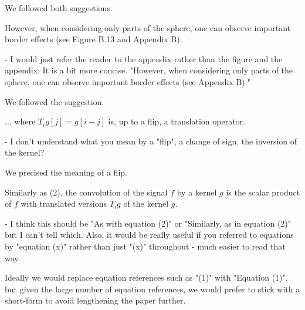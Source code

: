 \documentclass[12pt,a4paper]{article}
\newcommand{\nati}[1]{{\color[rgb]{.1,.6,.1}{NP: #1}}}
\newcommand{\mdeff}[1]{{\color[rgb]{.1,.6,.1}{MD: #1}}}
\newcommand{\1}{\b{1}}              %
\newcommand{\0}{\b{0}}              %
\begin{document}
We followed both suggestions.

\begin{mdframed}[style=comment]
However, when considering only parts of the sphere, one can observe important border effects (see Figure B.13 and Appendix B).

- I would just refer the reader to the appendix rather than the figure and the appendix. It is a bit more concise. "However, when considering only parts of the sphere, one can observe important border effects (see Appendix B)."
\end{mdframed}

We followed the suggestion.

\begin{mdframed}[style=comment]
... where $T_ig[j]=g[i-j]$ is, up to a flip, a translation operator.

 - I don't understand what you mean by a "flip", a change of sign, the inversion of the kernel?
\end{mdframed}

We precised the meaning of a flip.

\begin{mdframed}[style=comment]
Similarly as (2), the convolution of the signal $f$ by a kernel $g$ is the scalar product of $f$ with translated versions $T_ig$ of the kernel $g$.

- I think this should be "As with equation (2)" or "Similarly, as in equation (2)" but I can't tell which. Also, it would be really useful if you referred to equations by "equation (x)" rather than just "(x)" throughout - much easier to read that way.
\end{mdframed}

Ideally we would replace equation references such as "(1)" with "Equation (1)", but given the large number of equation references, we would prefer to stick with a short-form to avoid lengthening the paper further.
\end{document}
